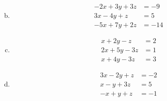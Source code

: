 \documentclass[../main.tex]{subfiles}
\begin{document}
\begin{enumerate}[a)]
	\setcounter{enumi}{1}
	\item 
		\begin{align*}
			-2x + 3y + 3z &= -9 \\
			3x - 4y + z &= 5 \\
			-5x + 7y + 2z &= -14
		\end{align*}
	\setcounter{enumi}{3}
	\item 
		\begin{align*}
			x + 2y - z &= 2 \\
			2x + 5y - 3z &= 1 \\
			x + 4y - 3z &= 3
		\end{align*}
	\setcounter{enumi}{5}
	\item 
		\begin{align*}
			3x - 2y + z &= -2 \\
			x - y + 3z &= 5 \\
			-x + y + z &= -1
		\end{align*}
\end{enumerate}
\end{document}
